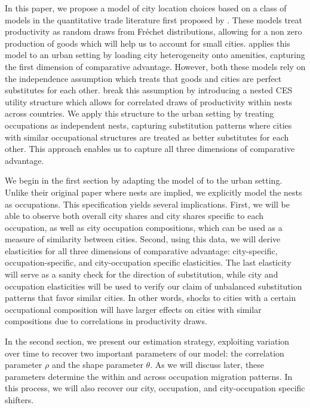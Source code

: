 \documentclass[10pt]{article}
\begin{document}
In this paper, we propose a model of city location choices based on a class of models in the quantitative trade literature first proposed by \cite{ek}. These models treat productivity as random draws from Fr\'{e}chet distributions, allowing for a non zero production of goods which will help us to account for small cities. \cite{redding} applies this model to an urban setting by loading city heterogeneity onto amenities, capturing the first dimension of comparative advantage. However, both these models rely on the independence assumption which treats that goods and cities are perfect substitutes for each other. \cite{lindandramondo} break this assumption by introducing a nested CES utility structure which allows for correlated draws of productivity within nests across countries. We apply this structure to the urban setting by treating occupations as independent nests, capturing substitution patterns where cities with similar occupational structures are treated as better substitutes for each other. This approach enables us to capture all three dimensions of comparative advantage.

We begin in the first section by adapting the model of \cite{lindandramondo} to the urban setting. Unlike their original paper where nests are implied, we explicitly model the nests as occupations. This specification yields several implications. First, we will be able to observe both overall city shares and city shares specific to each occupation, as well as city occupation compositions, which can be used as a measure of similarity between cities. Second, using this data, we will derive elasticities for all three dimensions of comparative advantage: city-specific, occupation-specific, and city-occupation specific elasticities. The last elasticity will serve as a sanity check for the direction of substitution, while city and occupation elasticities will be used to verify our claim of unbalanced substitution patterns that favor similar cities. In other words, shocks to cities with a certain occupational composition will have larger effects on cities with similar compositions due to correlations in productivity draws.

In the second section, we present our estimation strategy, exploiting variation over time to recover two important parameters of our model: the correlation parameter $\rho$ and the shape parameter $\theta$. As we will discuss later, these parameters determine the within and across occupation migration patterns. In this process, we will also recover our city, occupation, and city-occupation specific shifters.
\end{document}
